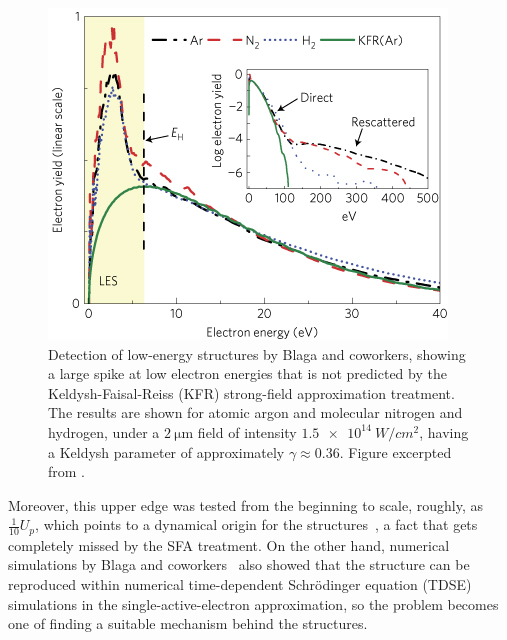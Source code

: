 \begin{figure}[thb]
  \centering
  \includegraphics[scale=0.6]{6-LES/Figures/figure6A.jpg}
  \hspace{2mm}
  \caption[
  Initial observation of Low-Energy Structures by C.I. Blaga et al.
  ]{
  Detection of low-energy structures by Blaga and coworkers, showing a large spike at low electron energies that is not predicted by the Keldysh-Faisal-Reiss (KFR) strong-field approximation treatment. The results are shown for atomic argon and molecular nitrogen and hydrogen, under a $\SI{2}{\micro\meter}$ field of intensity $\SI{1.5e14}{W/cm^2}$, having a Keldysh parameter of approximately $\gamma \approx 0.36$.
  Figure excerpted from .
  }
\label{f6-blaga-original-figure}
\end{figure}


Moreover, this upper edge was tested from the beginning to scale, roughly, as $\frac{1}{10}U_p$, which points to a dynamical origin for the structures~\cite{ faisal_ionization_surprise, agostini_ionization-review_2012}, a fact that gets completely missed by the SFA treatment. On the other hand, numerical simulations by Blaga and coworkers~\cite{blaga_original_LES,catoire_angular-distributions_2009} also showed that the structure can be reproduced within numerical time-dependent Schrödinger equation (TDSE) simulations in the single-active-electron approximation, so the problem becomes one of finding a suitable mechanism behind the structures.

